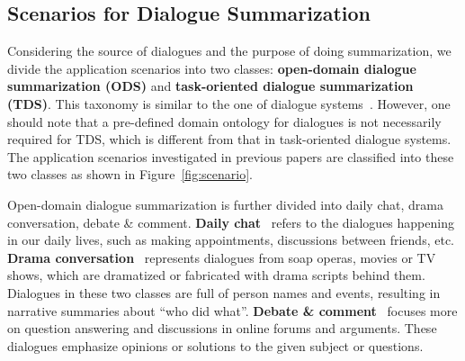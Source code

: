 


\subsection{Scenarios for Dialogue Summarization}\label{sec:scenarios}

Considering the source of dialogues and the purpose of doing summarization,
we divide the application scenarios into two classes: \textbf{open-domain dialogue summarization (ODS)} and \textbf{task-oriented dialogue summarization (TDS)}. This taxonomy is similar to the one of dialogue systems~\cite{gao2020standard,chen2017survey}.
However, one should note that a pre-defined domain ontology for dialogues is 
not necessarily required for TDS, which is different from that in 
task-oriented dialogue systems.
The application scenarios investigated in previous papers 
are classified into these two classes as shown in Figure~\ref{fig:scenario}.

Open-domain dialogue summarization is further divided into daily chat, 
drama conversation, debate \& comment. 
\textbf{Daily chat}~\cite{gliwa2019samsum,chen2021dialsumm} refers to the dialogues happening in our daily lives, 
such as making appointments, discussions between friends, etc. 
\textbf{Drama conversation}~\cite{rameshkumar2020storytelling,zhu2021mediasum,malykh2020sumtitles,chen2021summscreen} represents dialogues from soap operas, 
movies or TV shows, which are dramatized or fabricated with drama scripts 
behind them. Dialogues in these two classes are full of person names 
and events, resulting in narrative summaries about ``who did what''.
\textbf{Debate \& comment}~\cite{misra2015using,fabbri2021convosumm,chowdhury2019cqasumm} focuses more on question answering and 
discussions in online forums and arguments. These dialogues emphasize opinions or solutions to the given subject or questions.

